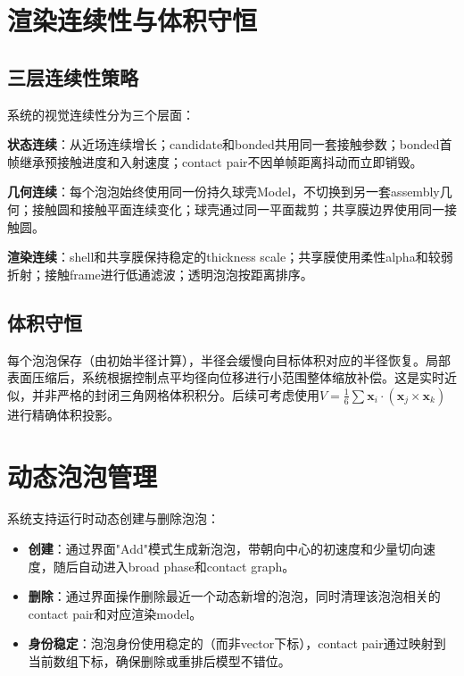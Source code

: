 \section{渲染连续性与体积守恒}

\subsection{三层连续性策略}

系统的视觉连续性分为三个层面：

\textbf{状态连续}：从近场连续增长；candidate和bonded共用同一套接触参数；bonded首帧继承预接触进度和入射速度；contact pair不因单帧距离抖动而立即销毁。

\textbf{几何连续}：每个泡泡始终使用同一份持久球壳Model，不切换到另一套assembly几何；接触圆和接触平面连续变化；球壳通过同一平面裁剪；共享膜边界使用同一接触圆。

\textbf{渲染连续}：shell和共享膜保持稳定的thickness scale；共享膜使用柔性alpha和较弱折射；接触frame进行低通滤波；透明泡泡按距离排序。

\subsection{体积守恒}

每个泡泡保存（由初始半径计算），半径会缓慢向目标体积对应的半径恢复。局部表面压缩后，系统根据控制点平均径向位移进行小范围整体缩放补偿。这是实时近似，并非严格的封闭三角网格体积积分。后续可考虑使用$V = \frac{1}{6}\sum \mathbf{x}_i \cdot (\mathbf{x}_j \times \mathbf{x}_k)$进行精确体积投影。

\section{动态泡泡管理}

系统支持运行时动态创建与删除泡泡：

\begin{itemize}
  \item \textbf{创建}：通过界面"Add"模式生成新泡泡，带朝向中心的初速度和少量切向速度，随后自动进入broad phase和contact graph。
  \item \textbf{删除}：通过界面操作删除最近一个动态新增的泡泡，同时清理该泡泡相关的contact pair和对应渲染model。
  \item \textbf{身份稳定}：泡泡身份使用稳定的（而非vector下标），contact pair通过映射到当前数组下标，确保删除或重排后模型不错位。
\end{itemize}

